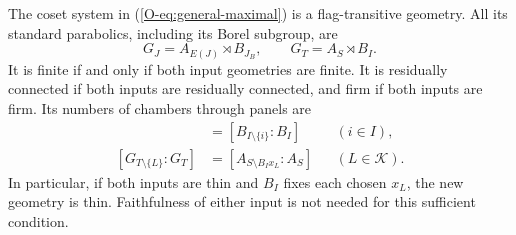 \begin{theorem}\label{O-thm:general-twist}
The coset system in (\ref{O-eq:general-maximal}) is a flag-transitive
geometry. All its standard parabolics, including its Borel subgroup, are
\begin{equation}\label{O-eq:general-parabolics}
 G_J=A_{E(J)}\rtimes B_{J_B},\qquad G_T=A_S\rtimes B_I.
\end{equation}
It is finite if and only if both input geometries are finite. It is
residually connected if both inputs are residually connected, and firm
if both inputs are firm. Its numbers of chambers through panels are
\begin{align}
 [G_{T\setminus\{i\}}:G_T]&=[B_{I\setminus\{i\}}:B_I]
       &&(i\in I),\label{O-eq:old-panel}\\
 [G_{T\setminus\{L\}}:G_T]&=[A_{S\setminus B_Ix_L}:A_S]
       &&(L\in\mathcal K).\label{O-eq:new-panel}
\end{align}
In particular, if both inputs are thin and $B_I$ fixes each chosen
$x_L$, the new geometry is thin. Faithfulness of either input is not
needed for this sufficient condition.
\end{theorem}
